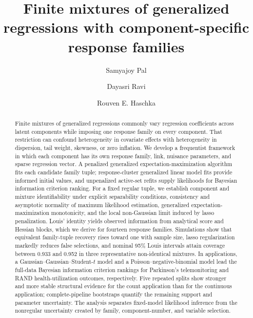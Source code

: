 \documentclass[a4paper,fleqn]{cas-sc}
\begin{document}
\let\WriteBookmarks\relax
\def\floatpagepagefraction{1}
\def\textpagefraction{.001}


\title[mode=title]{Finite mixtures of generalized regressions with component-specific response families}

\author[1]{Samyajoy Pal}
\cormark[1]
\author[2]{Dayasri Ravi}
\author[1]{Rouven E. Haschka}


\begin{abstract}
Finite mixtures of generalized regressions commonly vary regression coefficients across latent components while imposing one response family on every component. That restriction can confound heterogeneity in covariate effects with heterogeneity in dispersion, tail weight, skewness, or zero inflation. We develop a frequentist framework in which each component has its own response family, link, nuisance parameters, and sparse regression vector. A penalized generalized expectation-maximization algorithm fits each candidate family tuple; response-cluster generalized linear model fits provide informed initial values, and unpenalized active-set refits supply likelihoods for Bayesian information criterion ranking. For a fixed regular tuple, we establish component and mixture identifiability under explicit separability conditions, consistency and asymptotic normality of maximum likelihood estimation, generalized expectation-maximization monotonicity, and the local non-Gaussian limit induced by lasso penalization. Louis' identity yields observed information from analytical score and Hessian blocks, which we derive for fourteen response families. Simulations show that equivalent family-tuple recovery rises toward one with sample size, lasso regularization markedly reduces false selections, and nominal 95\% Louis intervals attain coverage between 0.933 and 0.952 in three representative non-identical mixtures. In applications, a Gaussian--Gaussian--Student-$t$ model and a Poisson--negative-binomial model lead the full-data Bayesian information criterion rankings for Parkinson's telemonitoring and RAND health-utilization outcomes, respectively. Five repeated splits show stronger and more stable structural evidence for the count application than for the continuous application; complete-pipeline bootstraps quantify the remaining support and parameter uncertainty. The analysis separates fixed-model likelihood inference from the nonregular uncertainty created by family, component-number, and variable selection.
\end{abstract}
\end{document}
